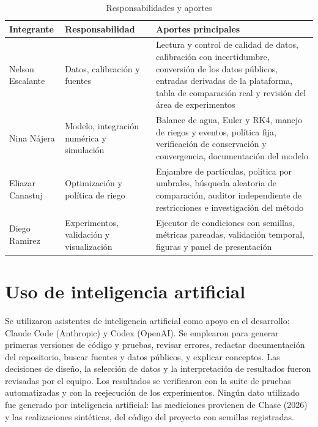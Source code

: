 \documentclass[12pt]{article}
\begin{document}
\begin{table}[H]
\centering
\caption{Responsabilidades y aportes}
\small
\begin{tabularx}{\textwidth}{|l|X|X|}
\hline
Integrante & Responsabilidad & Aportes principales \\
\hline
Nelson Escalante & Datos, calibración y fuentes & Lectura y control de calidad de datos, calibración con incertidumbre, conversión de los datos públicos, entradas derivadas de la plataforma, tabla de comparación real y revisión del área de experimentos \\
\hline
Nina Nájera & Modelo, integración numérica y simulación & Balance de agua, Euler y RK4, manejo de riegos y eventos, política fija, verificación de conservación y convergencia, documentación del modelo \\
\hline
Eliazar Canastuj & Optimización y política de riego & Enjambre de partículas, política por umbrales, búsqueda aleatoria de comparación, auditor independiente de restricciones e investigación del método \\
\hline
Diego Ramirez & Experimentos, validación y visualización & Ejecutor de condiciones con semillas, métricas pareadas, validación temporal, figuras y panel de presentación \\
\hline
\end{tabularx}
\end{table}

\section{Uso de inteligencia artificial}

Se utilizaron asistentes de inteligencia artificial como apoyo en el desarrollo: Claude Code (Anthropic) y Codex (OpenAI). Se emplearon para generar primeras versiones de código y pruebas, revisar errores, redactar documentación del repositorio, buscar fuentes y datos públicos, y explicar conceptos. Las decisiones de diseño, la selección de datos y la interpretación de resultados fueron revisadas por el equipo. Los resultados se verificaron con la suite de pruebas automatizadas y con la reejecución de los experimentos. Ningún dato utilizado fue generado por inteligencia artificial: las mediciones provienen de Chase (2026) y las realizaciones sintéticas, del código del proyecto con semillas registradas.
\end{document}
